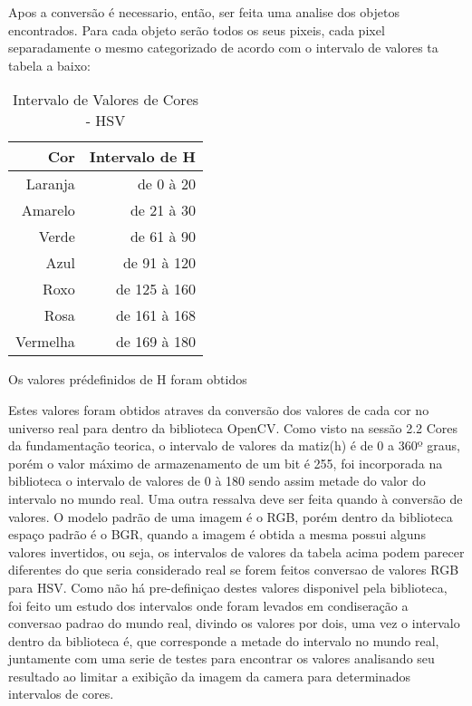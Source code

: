 Apos a conversão é necessario, então, ser feita uma analise dos objetos encontrados. Para cada objeto serão todos os seus pixeis, cada pixel separadamente o mesmo categorizado de acordo com o intervalo de valores ta tabela a baixo:

\begin{table}[h]
\centering
\begin{tabular}{r|r}
Cor & Intervalo de H \\ %
\hline                               %
Laranja & de 0 à 20 \\
\hline 
Amarelo & de 21 à 30\\
\hline 
Verde & de 61 à 90 \\
\hline 
Azul& de 91 à 120 \\
\hline 
Roxo & de 125 à 160 \\
\hline 
Rosa & de 161 à 168 \\
\hline 
Vermelha & de 169 à 180 \\
\hline 
\end{tabular}
\caption{Intervalo de Valores de Cores - HSV}
\end{table}


Os valores prédefinidos de H foram obtidos 


Estes valores foram obtidos atraves da conversão dos valores de cada cor no universo real para dentro da biblioteca OpenCV. Como visto na sessão 2.2 Cores da fundamentação teorica, o intervalo de valores da matiz(h) é de 0 a 360º graus, porém o valor máximo de armazenamento de um bit é 255, foi incorporada na biblioteca o intervalo de valores de 0 à 180 sendo assim metade do valor do intervalo no mundo real. Uma outra ressalva deve ser feita quando à conversão de valores. O modelo padrão de uma imagem é o RGB, porém dentro da biblioteca espaço padrão é o BGR, quando a imagem é obtida a mesma possui alguns valores invertidos, ou seja, os intervalos de valores da tabela acima podem parecer diferentes do que seria considerado real se forem feitos conversao de valores RGB para HSV.
Como não há pre-definiçao destes valores disponivel pela biblioteca, foi feito um estudo dos intervalos onde foram levados em condiseração a conversao padrao do mundo real, divindo os valores por dois, uma vez o intervalo dentro da biblioteca é, que corresponde a metade do intervalo no mundo real, juntamente com uma serie de testes para encontrar os valores analisando seu resultado ao limitar a exibição da imagem da camera para determinados intervalos de cores.


